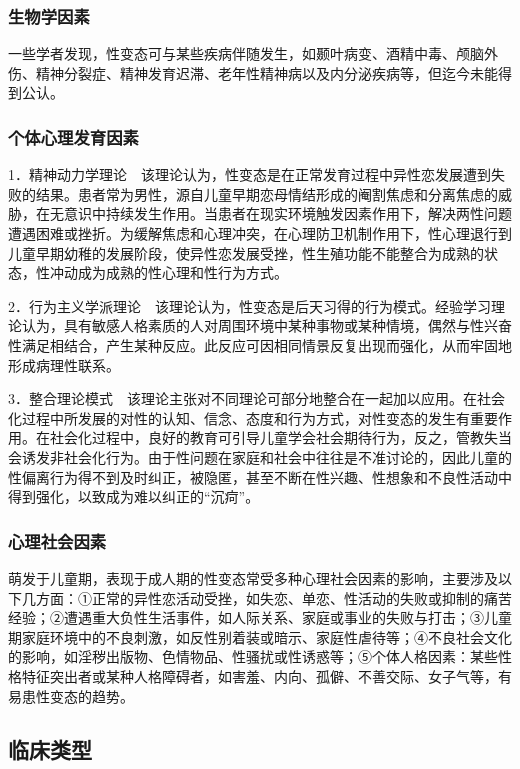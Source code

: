 \subsubsection{生物学因素}

一些学者发现，性变态可与某些疾病伴随发生，如颞叶病变、酒精中毒、颅脑外伤、精神分裂症、精神发育迟滞、老年性精神病以及内分泌疾病等，但迄今未能得到公认。

\subsubsection{个体心理发育因素}

1．精神动力学理论　该理论认为，性变态是在正常发育过程中异性恋发展遭到失败的结果。患者常为男性，源自儿童早期恋母情结形成的阉割焦虑和分离焦虑的威胁，在无意识中持续发生作用。当患者在现实环境触发因素作用下，解决两性问题遭遇困难或挫折。为缓解焦虑和心理冲突，在心理防卫机制作用下，性心理退行到儿童早期幼稚的发展阶段，使异性恋发展受挫，性生殖功能不能整合为成熟的状态，性冲动成为成熟的性心理和性行为方式。

2．行为主义学派理论　该理论认为，性变态是后天习得的行为模式。经验学习理论认为，具有敏感人格素质的人对周围环境中某种事物或某种情境，偶然与性兴奋性满足相结合，产生某种反应。此反应可因相同情景反复出现而强化，从而牢固地形成病理性联系。

3．整合理论模式　该理论主张对不同理论可部分地整合在一起加以应用。在社会化过程中所发展的对性的认知、信念、态度和行为方式，对性变态的发生有重要作用。在社会化过程中，良好的教育可引导儿童学会社会期待行为，反之，管教失当会诱发非社会化行为。由于性问题在家庭和社会中往往是不准讨论的，因此儿童的性偏离行为得不到及时纠正，被隐匿，甚至不断在性兴趣、性想象和不良性活动中得到强化，以致成为难以纠正的“沉疴”。

\subsubsection{心理社会因素}

萌发于儿童期，表现于成人期的性变态常受多种心理社会因素的影响，主要涉及以下几方面：①正常的异性恋活动受挫，如失恋、单恋、性活动的失败或抑制的痛苦经验；②遭遇重大负性生活事件，如人际关系、家庭或事业的失败与打击；③儿童期家庭环境中的不良刺激，如反性别着装或暗示、家庭性虐待等；④不良社会文化的影响，如淫秽出版物、色情物品、性骚扰或性诱惑等；⑤个体人格因素：某些性格特征突出者或某种人格障碍者，如害羞、内向、孤僻、不善交际、女子气等，有易患性变态的趋势。

\subsection{临床类型}

